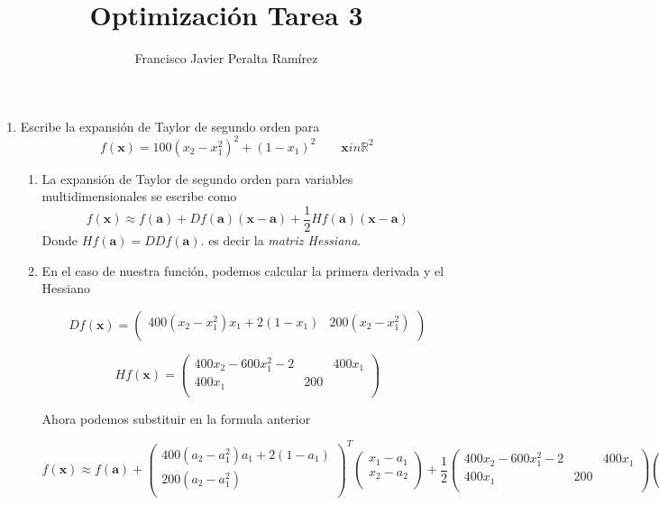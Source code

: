 \documentclass{article}
\title {Optimización Tarea 3}
\author {Francisco Javier Peralta Ramírez}
\date{\vspace{-2ex}}
\begin{document}
\maketitle

\begin{enumerate}
\item Escribe la expansión de Taylor de segundo orden para
$$f(\boldsymbol{x}) = 100(x_2-x_1^2)^2 + (1 - x_1)^2 \qquad \boldsymbol{x} in \mathbb{R}^2$$
\begin{enumerate}
\item La expansión de Taylor de segundo orden para variables multidimensionales se escribe como
$$f(\boldsymbol{x}) \approx f(\boldsymbol{a}) + Df(\boldsymbol{a})(\boldsymbol{x - a}) + \frac{1}{2}Hf(\boldsymbol{a})(\boldsymbol{x - a})$$
Donde $Hf(\boldsymbol{a}) = DDf(\boldsymbol{a}).$ es decir la \emph{matriz Hessiana}.
\item En el caso de nuestra función, podemos calcular la primera derivada y el Hessiano

$$
Df(\boldsymbol{x})= 
 \begin{pmatrix}
  400(x_2 - x_1^2)x_1 + 2(1 - x_1) &
  200(x_2 - x_1^2)\\
 \end{pmatrix}
$$

$$
Hf(\boldsymbol{x})= 
 \begin{pmatrix}
  400 x_2 - 600x_1^2 - 2 && 400x_1\\
  400x_1 & 200\\
 \end{pmatrix}
$$

Ahora podemos substituir en la formula anterior 

$$f(\boldsymbol{x}) \approx f(\boldsymbol{a}) + \begin{pmatrix}
  400(a_2 - a_1^2)a_1 + 2(1 - a_1) \\
  200(a_2 - a_1^2)\\
 \end{pmatrix}^T
 \begin{pmatrix}
  x_1 - a_1\\
  x_2 - a_2\\
 \end{pmatrix} + \frac{1}{2} \begin{pmatrix}
  400 x_2 - 600x_1^2 - 2 && 400x_1\\
  400x_1 & 200\\
 \end{pmatrix}\begin{pmatrix}
  x_1 - a_1\\
  x_2 - a_2\\
 \end{pmatrix}$$


\end{enumerate}
\end{enumerate}
\end{document}
